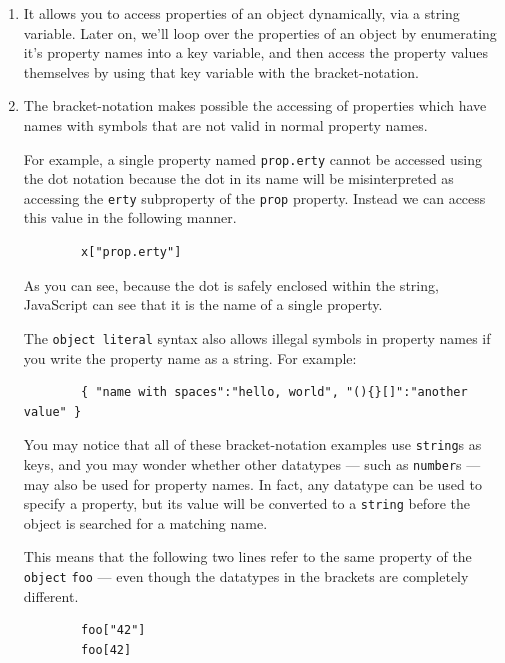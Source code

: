 \documentclass[11pt,letter]{book}
\begin{document}
    \begin{enumerate}
        \item It allows you to access properties of an object dynamically, via a string variable. 
        Later on, we'll loop over the properties of an object by enumerating it's property names 
        into a key variable, and then access the property values themselves by using that key 
        variable with the bracket-notation.
    
        \item The bracket-notation makes possible the accessing of properties which have names with 
        symbols that are not valid in normal property names. 
        
        For example, a single property named \texttt{prop.erty} cannot be accessed using the dot 
        notation because the dot in its name will be misinterpreted as accessing the \texttt{erty} 
        subproperty of the \texttt{prop} property. Instead we can access this value in the following 
        manner.
        
        \begin{verbatim}
        x["prop.erty"]
        \end{verbatim}
        
        As you can see, because the dot is safely enclosed within the string, JavaScript can see 
        that it is the name of a single property.
        
        The \texttt{object literal} syntax also allows illegal symbols in property names if you 
        write the property name as a string. For example:
        
        \begin{verbatim}
        { "name with spaces":"hello, world", "(){}[]":"another value" }
        \end{verbatim}
        
        You may notice that all of these bracket-notation examples use \texttt{string}s as keys, and 
        you may wonder whether other datatypes --- such as \texttt{number}s --- may also be used for 
        property names. In fact, any datatype can be used to specify a property, but its value will 
        be converted to a \texttt{string} before the object is searched for a matching name.
        
        This means that the following two lines refer to the same property of the \texttt{object} 
        \texttt{foo} --- even though the datatypes in the brackets are completely different.
        
        \begin{verbatim}
        foo["42"]
        foo[42]
        \end{verbatim}
    
    \end{enumerate}
    
\end{document}
